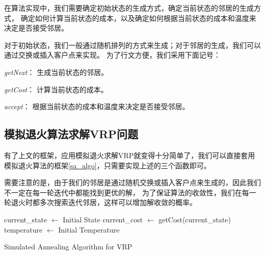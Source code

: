 在算法实现中，我们需要确定初始状态的生成方式，确定当前状态的邻居的生成方式，
确定如何计算当前状态的成本，以及确定如何根据当前状态的成本和温度来决定是否接受邻居。

对于初始状态，我们一般通过随机排列的方式来生成；对于邻居的生成，我们可以通过交换或插入客户点来实现。
为了行文方便，我们采用下面记号：

\textit{getNext}： 生成当前状态的邻居。

\textit{getCost}： 计算当前状态的成本。

\textit{accept}： 根据当前状态的成本和温度来决定是否接受邻居。

\subsection{模拟退火算法求解VRP问题}

有了上文的框架，应用模拟退火求解VRP就变得十分简单了，我们可以直接套用模拟退火算法的框架\ref{sa_algo}，只需要实现上述的三个函数即可。

需要注意的是，由于我们的邻居是通过随机交换或插入客户点来生成的，因此我们不一定在每一轮迭代中都能找到更优的解，
为了保证算法的收敛性，我们在每一轮退火时都多次搜索迭代邻居，这样可以增加解收敛的概率。

\begin{algorithm}[H]
    


    current\_state $\leftarrow$ Initial State\;
    current\_cost $\leftarrow$ getCost(current\_state)\;
    temperature $\leftarrow$ Initial Temperature\;


    \caption{Simulated Annealing Algorithm for VRP}
\end{algorithm}

